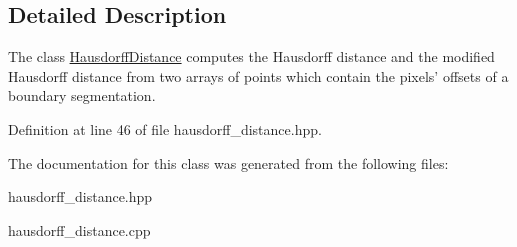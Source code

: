\subsection{Detailed Description}
The class \hyperlink{classofeli_1_1_hausdorff_distance}{Hausdorff\-Distance} computes the Hausdorff distance and the modified Hausdorff distance from two arrays of points which contain the pixels' offsets of a boundary segmentation. 

Definition at line 46 of file hausdorff\-\_\-distance.\-hpp.



The documentation for this class was generated from the following files\-:\begin{DoxyCompactItemize}
\item 
hausdorff\-\_\-distance.\-hpp\item 
hausdorff\-\_\-distance.\-cpp\end{DoxyCompactItemize}

